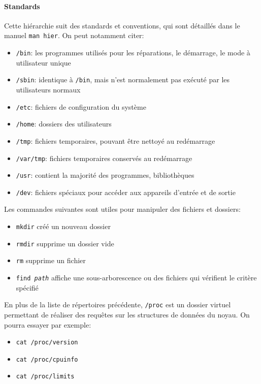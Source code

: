 \documentclass[french, toc]{../cs-classes/cs-classes}
\begin{document}
\paragraph{Standards} Cette hiérarchie suit des standards et conventions, qui sont détaillés dans le manuel \texttt{man hier}. On peut notamment citer:
\begin{itemize}
    \item \texttt{/bin}: les programmes utilisés pour les réparations, le démarrage, le mode à utilisateur unique
    \item \texttt{/sbin}: identique à \texttt{/bin}, mais n'est normalement pas exécuté par les utilisateurs normaux
    \item \texttt{/etc}: fichiers de configuration du système
    \item \texttt{/home}: dossiers des utilisateurs
    \item \texttt{/tmp}: fichiers temporaires, pouvant être nettoyé au redémarrage
    \item \texttt{/var/tmp}: fichiers temporaires conservés au redémarrage
    \item \texttt{/usr}: contient la majorité des programmes, bibliothèques
    \item \texttt{/dev}: fichiers spéciaux pour accéder aux appareils d'entrée et de sortie 
\end{itemize}

Les commandes suivantes sont utiles pour manipuler des fichiers et dossiers:
\begin{itemize}
    \item \texttt{mkdir} créé un nouveau dossier
    \item \texttt{rmdir} supprime un dossier vide
    \item \texttt{rm} supprime un fichier
    \item \texttt{find \emph{path}} affiche une sous-arborescence ou des fichiers qui vérifient le critère spécifié
\end{itemize}

En plus de la liste de répertoires précédente, \texttt{/proc} est un dossier virtuel permettant de réaliser des requêtes sur les structures de données du noyau. On pourra essayer par exemple:
\begin{itemize}
    \item \texttt{cat /proc/version}
    \item \texttt{cat /proc/cpuinfo}
    \item \texttt{cat /proc/limits}
\end{itemize}
\end{document}
